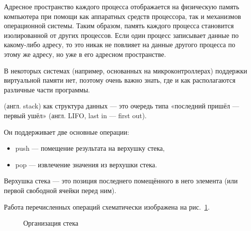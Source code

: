Адресное пространство каждого процесса отображается на физическую
память компьютера при помощи как аппаратных средств процессора, так и
механизмов операционной системы. Таким образом, память каждого
процесса становится изолированной от других процессов. Если один
процесс записывает данные по какому-либо адресу, то это никак не
повлияет на данные другого процесса по этому же адресу, но уже в его
адресном пространстве.

В некоторых системах (например, основанных на микроконтроллерах)
поддержки виртуальной памяти нет, поэтому очень важно знать, где и как
располагаются различные части программы.


\begin{defn}
 (англ. stack) как структура данных — это очередь
типа «последний пришёл — первый ушёл» (англ. LIFO, last in — first
out).
\end{defn}

Он поддерживает две основные операции:
\begin{itemize}
\item push — помещение результата на верхушку стека,
\item pop — извлечение значения из верхушки стека.
\end{itemize}
Верхушка стека — это позиция последнего помещённого в него элемента
(или первой свободной ячейки перед ним).

Работа перечисленных операций схематически изображена на
рис.~\ref{fig:stack}.

\begin{figure}
  \begin{centering}
    \par
  \end{centering}
  
  \caption{Организация стека\label{fig:stack}}
\end{figure}

